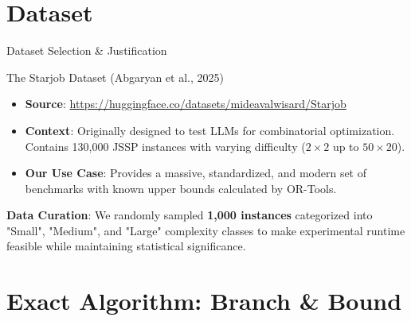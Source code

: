 \documentclass{beamer}
\begin{document}
\section{Dataset}

\begin{frame}{Dataset Selection \& Justification}
    \begin{block}{The Starjob Dataset (Abgaryan et al., 2025)}
        \begin{itemize}[<+->]
            \item \textbf{Source}: \url{https://huggingface.co/datasets/mideavalwisard/Starjob}
            \item \textbf{Context}: Originally designed to test LLMs for combinatorial optimization. Contains 130,000 JSSP instances with varying difficulty ($2\times 2$ up to $50\times 20$).
            \item \textbf{Our Use Case}: Provides a massive, standardized, and modern set of benchmarks with known upper bounds calculated by OR-Tools.
        \end{itemize}
    \end{block}
    
    \pause
    \vspace{0.5em}
    \textbf{Data Curation}:
    We randomly sampled \textbf{1,000 instances} categorized into "Small", "Medium", and "Large" complexity classes to make experimental runtime feasible while maintaining statistical significance.
\end{frame}

\section{Exact Algorithm: Branch \& Bound}
\end{document}
